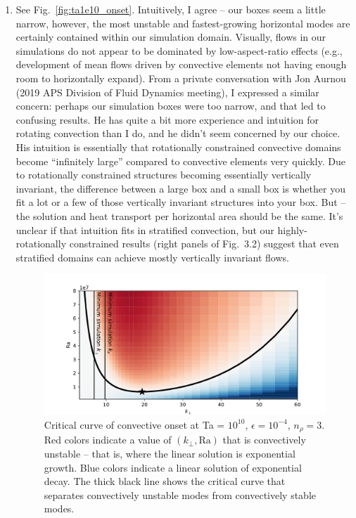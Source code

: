 \documentclass[aps, pre, onecolumn, nofootinbib, notitlepage, groupedaddress, amsfonts, amssymb, amsmath, longbibliography, superscriptaddress]{revtex4-1}
\begin{document}
\begin{enumerate}
\item See Fig.~\ref{fig:ta1e10_onset}. 
Intuitively, I agree -- our boxes seem a little narrow, however, the most unstable and fastest-growing horizontal modes are certainly contained within our simulation domain.
Visually, flows in our simulations do not appear to be dominated by low-aspect-ratio effects (e.g., development of mean flows driven by convective elements not having enough room to horizontally expand).
From a private conversation with Jon Aurnou (2019 APS Division of Fluid Dynamics meeting), I expressed a similar concern: perhaps our simulation boxes were too narrow, and that led to confusing results.
He has quite a bit more experience and intuition for rotating convection than I do, and he didn't seem concerned by our choice.
His intuition is essentially that rotationally constrained convective domains become ``infinitely large'' compared to convective elements very quickly.
Due to rotationally constrained structures becoming essentially vertically invariant, the difference between a large box and a small box is whether you fit a lot or a few of those vertically invariant structures into your box.
But -- the solution and heat transport per horizontal area should be the same.
It's unclear if that intuition fits in stratified convection, but our highly-rotationally constrained results (right panels of Fig.~3.2) suggest that even stratified domains can achieve mostly vertically invariant flows.
\begin{figure}[t!]
\includegraphics[width=\textwidth]{./figs/crit_curve_ta1e10.pdf}
\caption{ 
	Critical curve of convective onset at Ta = $10^{10}$, $\epsilon = 10^{-4}$, $n_\rho = 3$.
	Red colors indicate a value of $(k_\perp, \text{Ra})$ that is convectively unstable -- that is, where the linear solution is exponential growth.
	Blue colors indicate a linear solution of exponential decay.
	The thick black line shows the critical curve that separates convectively unstable modes from convectively stable modes.
}
\end{figure}
\end{enumerate}
\end{document}
